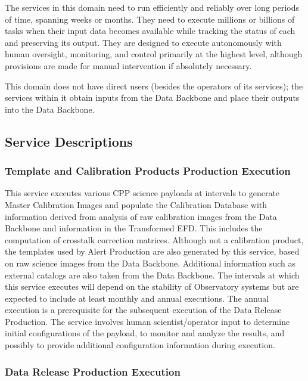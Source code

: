 \documentclass[DM,lsstdraft,toc]{lsstdoc}
\begin{document}
The services in this domain need to run efficiently and reliably over
long periods of time, spanning weeks or months. They need to execute
millions or billions of tasks when their input data becomes available
while tracking the status of each and preserving its output. They are
designed to execute autonomously with human oversight, monitoring, and
control primarily at the highest level, although provisions are made for
manual intervention if absolutely necessary.

This domain does not have direct users (besides the operators of its
services); the services within it obtain inputs from the Data Backbone
and place their outputs into the Data Backbone.

\subsection{Service Descriptions}\label{service-descriptions-2}

\subsubsection{Template and Calibration Products Production
Execution}\label{template-and-calibration-products-production-execution}

This service executes various CPP science payloads at intervals to
generate Master Calibration Images and populate the Calibration Database
with information derived from analysis of raw calibration images from
the Data Backbone and information in the Transformed EFD. This includes
the computation of crosstalk correction matrices. Although not a
calibration product, the templates used by Alert Production are also
generated by this service, based on raw science images from the Data
Backbone. Additional information such as external catalogs are also
taken from the Data Backbone. The intervals at which this service
executes will depend on the stability of Observatory systems but are
expected to include at least monthly and annual executions. The annual
execution is a prerequisite for the subsequent execution of the Data
Release Production. The service involves human scientist/operator input
to determine initial configurations of the payload, to monitor and
analyze the results, and possibly to provide additional configuration
information during execution.

\subsubsection{Data Release Production
Execution}\label{data-release-production-execution}
\end{document}
